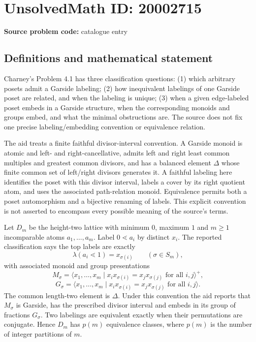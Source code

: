 \documentclass[11pt]{article}
\begin{document}
\section*{UnsolvedMath ID: 20002715}
\textbf{Source problem code:} catalogue entry
\subsection{Definitions and mathematical statement}
Charney's Problem 4.1 has three classification questions: (1) which arbitrary posets admit a Garside labeling; (2) how inequivalent labelings of one Garside poset are related, and when the labeling is unique; (3) when a given edge-labeled poset embeds in a Garside structure, when the corresponding monoids and groups embed, and what the minimal obstructions are. The source does not fix one precise labeling/embedding convention or equivalence relation.

The aid treats a finite faithful divisor-interval convention. A Garside monoid is atomic and left- and right-cancellative, admits left and right least common multiples and greatest common divisors, and has a balanced element $\Delta$ whose finite common set of left/right divisors generates it. A faithful labeling here identifies the poset with this divisor interval, labels a cover by its right quotient atom, and uses the associated path-relation monoid. Equivalence permits both a poset automorphism and a bijective renaming of labels. This explicit convention is not asserted to encompass every possible meaning of the source's terms.

Let $D_m$ be the height-two lattice with minimum $0$, maximum $1$ and $m\ge1$ incomparable atoms $a_1,\ldots,a_m$. Label $0\lessdot a_i$ by distinct $x_i$. The reported classification says the top labels are exactly
\[
 \lambda(a_i\lessdot1)=x_{\sigma(i)}\qquad(\sigma\in S_m),
\]
with associated monoid and group presentations
\[
 M_\sigma=\langle x_1,\ldots,x_m\mid
           x_i x_{\sigma(i)}=x_jx_{\sigma(j)}\text{ for all }i,j\rangle^+,
\]
\[
 G_\sigma=\langle x_1,\ldots,x_m\mid
           x_i x_{\sigma(i)}=x_jx_{\sigma(j)}\text{ for all }i,j\rangle.
\]
The common length-two element is $\Delta$. Under this convention the aid reports that $M_\sigma$ is Garside, has the prescribed divisor interval and embeds in its group of fractions $G_\sigma$. Two labelings are equivalent exactly when their permutations are conjugate. Hence $D_m$ has $p(m)$ equivalence classes, where $p(m)$ is the number of integer partitions of $m$.
\end{document}
